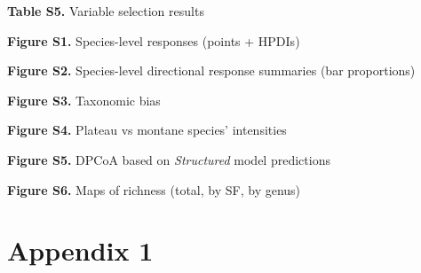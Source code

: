 \documentclass[preprint,review,times,12pt,3p]{elsarticle}
\begin{document}
\textbf{Table S5.} Variable selection results

\textbf{Figure S1.} Species-level responses (points + HPDIs)

\textbf{Figure S2.} Species-level directional response summaries (bar proportions)

\textbf{Figure S3.} Taxonomic bias

\textbf{Figure S4.} Plateau vs montane species' intensities

\textbf{Figure S5.} DPCoA based on \emph{Structured} model predictions

\textbf{Figure S6.} Maps of richness (total, by SF, by genus)




\newpage

\section{Appendix 1}
\end{document}
